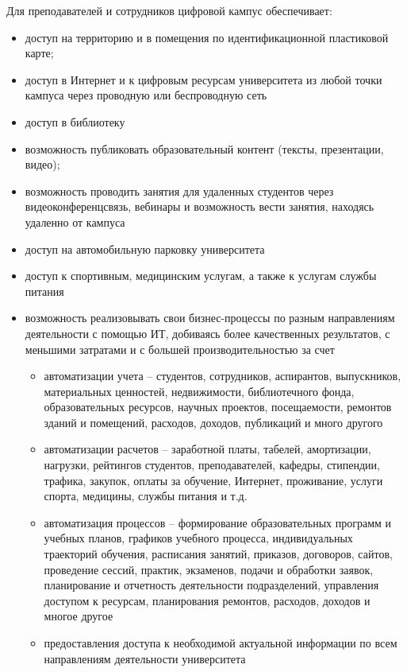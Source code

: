 Для преподавателей и сотрудников цифровой кампус обеспечивает:
 \begin{itemize}
	\item доступ на территорию и в помещения  по  идентификационной пластиковой карте;
	\item доступ в Интернет и к цифровым ресурсам университета из любой точки кампуса через проводную или беспроводную сеть
	\item доступ в библиотеку
	\item возможность публиковать образовательный контент (тексты, презентации, видео);
	\item возможность проводить занятия для удаленных студентов  через видеоконференцсвязь, вебинары и возможность  вести занятия, находясь удаленно от кампуса
	\item доступ на автомобильную  парковку университета
	\item доступ к спортивным, медицинским услугам, а также к услугам службы питания
	\item возможность реализовывать свои бизнес-процессы по разным направлениям деятельности с помощью ИТ, добиваясь более качественных результатов, с меньшими затратами и с большей производительностью за счет
	\begin{itemize}
		\item автоматизации учета – студентов, сотрудников, аспирантов, выпускников, материальных ценностей, недвижимости, библиотечного фонда, образовательных ресурсов, научных проектов, посещаемости, ремонтов зданий и помещений, расходов, доходов, публикаций и много другого
		\item автоматизации расчетов – заработной платы, табелей, амортизации, нагрузки, рейтингов студентов, преподавателей, кафедры, стипендии, трафика, закупок, оплаты  за обучение, Интернет, проживание, услуги спорта,  медицины, службы питания и т.д.
		\item автоматизация процессов – формирование образовательных  программ и учебных планов, графиков учебного процесса, индивидуальных траекторий обучения, расписания занятий, приказов, договоров, сайтов, проведение сессий, практик, экзаменов, подачи и обработки заявок, планирование и отчетность деятельности подразделений, управления доступом к ресурсам, планирования ремонтов, расходов, доходов  и многое другое
		\item предоставления доступа к необходимой актуальной информации по всем направлениям деятельности университета
	\end{itemize}
\end{itemize}
